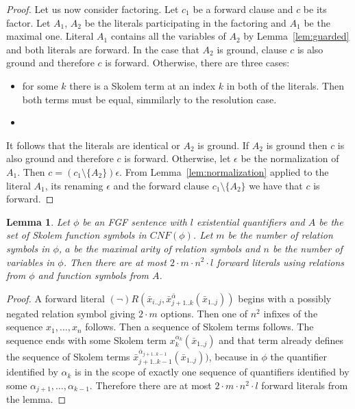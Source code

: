 \documentclass[english, shortabstract]{iithesis}
\theoremstyle{definition} \newtheorem{definition}{Definition}[chapter]
\theoremstyle{remark} \newtheorem{remark}[definition]{Observation}
\theoremstyle{plain} \newtheorem{theorem}[definition]{Theorem}
\theoremstyle{plain} \newtheorem{lemma}[definition]{Lemma}
\begin{document}
\begin{proof}
\par Let us now consider factoring. Let $c_1$ be a forward clause and $c$ be its factor.
Let $A_1$, $A_2$ be the literals participating in the factoring and $A_1$ be the maximal one.
Literal $A_1$ contains all the variables of $A_2$ by Lemma~\ref{lem:guarded} and both literals are forward. 
In the case that $A_2$ is ground, clause $c$ is also ground and therefore $c$ is forward. 
Otherwise, there are three cases:
\begin{itemize}
    \item for some $k$ there is a Skolem term at an index $k$ in both of the literals. Then both terms must be equal, simmilarly to the resolution case.
    \item 
\end{itemize}
It follows that the literals are identical or $A_2$ is ground. If $A_2$ is ground then $c$ is also ground and therefore $c$ is forward.
Otherwise, let $\epsilon$ be the normalization of $A_1$.
Then $c=(c_1\setminus\{A_2\})\epsilon$. From Lemma~\ref{lem:normalization} applied to the 
literal $A_1$, its renaming $\epsilon$ and the forward clause $c_1\setminus\{A_2\}$ we have that $c$ is forward.
\end{proof}

\begin{lemma}\label{lem:size}
Let $\phi$ be an FGF sentence with $l$ existential quantifiers and 
$A$ be the set of Skolem function symbols in $\mathit{CNF}(\phi)$.
Let $m$ be the number of relation symbols in $\phi$, $a$ be the maximal arity
of relation symbols and $n$ be the number of variables in $\phi$. 
Then there are at most $2\cdot m \cdot n^2 \cdot l$ forward literals using relations from $\phi$ and function symbols from $A$.
\end{lemma}
\begin{proof}
A forward literal $(\lnot)R(\bar{x}_{i..j}, \bar{x}^{\bar{\alpha}}_{{j+1..k}}(\bar{x}_{1..j}))$
begins with a possibly negated relation symbol giving $2\cdot m$ options. 
Then one of $n^2$ infixes of the sequence $x_1, \dots, x_n$ follows.
Then a sequence of Skolem terms follows.
The sequence ends with some Skolem term $x^{\alpha_k}_k(\bar{x}_{1..j})$ and that term 
already defines the sequence of Skolem terms $\bar{x}^{\bar{\alpha}_{j+1..k-1}}_{{j+1..k-1}}(\bar{x}_{1..j}))$,
because in $\phi$ the quantifier identified by $\alpha_k$ is in the scope of exactly one sequence of quantifiers identified by some $\alpha_{j+1},\dots, \alpha_{k-1}$.
Therefore there are at most $2\cdot m \cdot n^2 \cdot l$ forward literals from the lemma.
\end{proof}
\end{document}
